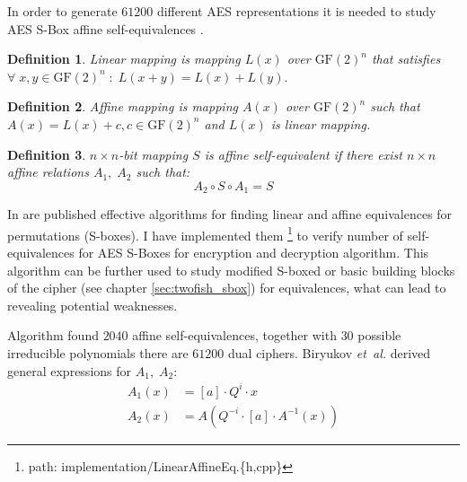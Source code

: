 \documentclass[11pt,oneside,final]{fithesis2}
\newtheorem{mydef}{Definition}
\begin{document}
	In order to generate $61200$ different AES representations it is needed to study AES S-Box affine self-equivalences \citep{Biryukov:2003:TCL:1766171.1766175}. 
	
	\begin{mydef}
	Linear mapping is mapping $L\left(x\right)$ over $\text{GF}(2)^n$ that satisfies $\forall \; x,y \in \text{GF}(2)^n \; : \; L(x+y) = L(x) + L(y).$
	\end{mydef}
	
	\begin{mydef}
	Affine mapping is mapping $A(x)$ over $\text{GF}(2)^n$ such that $A(x) = L(x) + c, c \in \text{GF}(2)^n$ and $L(x)$ is linear mapping.
	\end{mydef}
	
	\begin{mydef}
	$n \times n$-bit mapping $S$ is affine self-equivalent if there exist $n \times n$ affine relations $A_1,\;A_2$ such that: 
	\begin{equation}\label{eq:selfeq}
	A_2 \circ S \circ A_1 = S 
	\end{equation}
	\end{mydef}
	
	In \citep{Biryukov:2003:TCL:1766171.1766175} are published effective algorithms for finding linear and affine equivalences for permutations (S-boxes). I have implemented
	them \footnote{path: implementation/LinearAffineEq.\{h,cpp\}} to verify number of self-equivalences for AES S-Boxes for encryption and decryption algorithm. 
	This algorithm can be further used to study modified S-boxed or basic building blocks of the cipher (see chapter \ref{sec:twofish_sbox}) for equivalences, what can lead
	to revealing potential weaknesses.
	
	Algorithm found $2040$ affine self-equivalences, together with $30$ possible irreducible polynomials there are $61200$ dual ciphers.
	Biryukov \emph{et~al.} derived general expressions for $A_1,\;A_2$:
	\begin{subequations}
	\begin{align}
	    A_1(x) &= \left[a\right] \cdot Q^i \cdot x\\
	    A_2(x) &= A\left( Q^{-i} \cdot \left[a\right] \cdot A^{-1}\left(x\right) \right)
	\end{align}
	\end{subequations}
	
\end{document}
